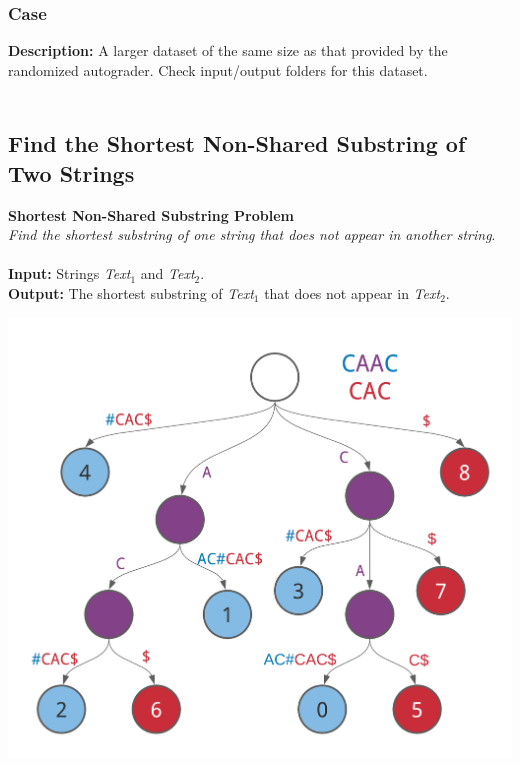 \documentclass{article}
\begin{document}
\subsubsection*{Case }
\hline \vspace{5}
\textbf{Description:} A larger dataset of the same size as that provided by the randomized autograder. Check input/output folders for this dataset.\\ \\
\pagebreak
\subsection{Find the Shortest Non-Shared Substring of Two Strings}
\hline\vspace{5}
\textbf{Shortest Non-Shared Substring Problem}\\
\emph{Find the shortest substring of one string that does not appear in another string}.\\ \\
\textbf{Input:} Strings \emph{Text}$_1$ and \emph{Text}$_2$.\\
\textbf{Output:} The shortest substring of \emph{Text}$_1$ that does not appear in \emph{Text}$_2$.
\begin{center}
    \includegraphics[scale=0.12]{c9/logos/9F.png}
\end{center}
\hline \vspace{5}
\end{document}
